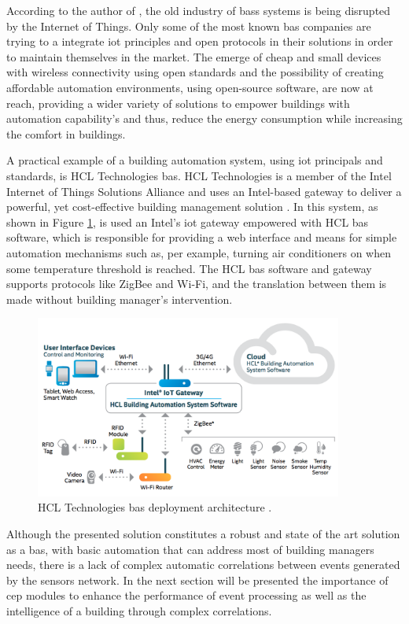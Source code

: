 According to the author of \cite{TransformativeWave}, the old industry of \ac{bas}s systems is being disrupted by the Internet of Things. Only some of the most known \ac{bas} companies are trying to a integrate \ac{iot} principles and open protocols in their solutions in order to maintain themselves in the market. The emerge of cheap and small devices with wireless connectivity using open standards and the possibility of creating affordable automation environments, using open-source software, are now at reach, providing a wider variety of solutions to empower buildings with automation capability's and thus, reduce the energy consumption while increasing the comfort in buildings.

A practical example of a building automation system, using \ac{iot} principals and standards, is HCL Technologies \ac{bas}. HCL Technologies is a member of the Intel Internet of Things Solutions Alliance \cite{intel} and uses an Intel-based gateway to deliver a powerful, yet cost-effective building management solution \cite{hcl}. In this system, as shown in Figure \ref{fig:intel}, is used an Intel's \ac{iot} gateway empowered with HCL \ac{bas} software, which is responsible for providing a web interface and means for simple automation mechanisms such as, per example, turning air conditioners on when some temperature threshold is reached. The HCL \ac{bas} software and gateway supports protocols like ZigBee and Wi-Fi, and the translation between them is made without building manager's intervention.


\begin{figure}[H]
	\centering
	\includegraphics[width=0.9\textwidth]{figures/intelhclarch.png}
	\caption{HCL Technologies \ac{bas} deployment architecture \cite{hcl}.}
	\label{fig:intel}
\end{figure}

Although the presented solution constitutes a robust and state of the art solution as a \ac{bas}, with basic automation that can address most of building managers needs, there is a lack of complex automatic correlations between events generated by the sensors network. In the next section will be presented the importance of \acf{cep} modules to enhance the performance of event processing as well as the intelligence of a building through complex correlations.

